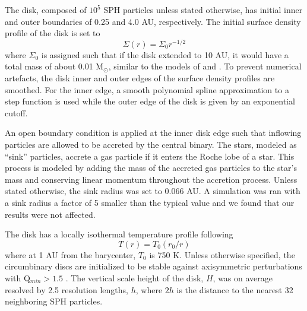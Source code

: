 The disk, composed of $10^5$ SPH particles unless stated otherwise, has initial inner and outer boundaries of 0.25 and 4.0 AU,
respectively.  The initial surface density profile of the disk is set to 
\begin{equation}
\Sigma(r) = \Sigma_0 r^{-1/2}
\end{equation}
 where $\Sigma_0$ is assigned such that if the disk extended to 10 AU, it would have a total mass of about 0.01 
M$_{\odot}$, similar to the models of \citet{PierensNelson07} and \citet{Kley2014}.  To prevent numerical 
artefacts, the disk inner and outer edges of the surface density profiles are smoothed.  For the inner edge, a smooth polynomial spline approximation to a step function is used while the outer edge of the disk is given by an exponential cutoff.
 
An open boundary condition is applied at the inner disk edge such that inflowing particles are allowed to be accreted
by the central binary.  The stars, modeled as ``sink'' particles, accrete a gas particle if it enters the Roche lobe of a star.  This process is modeled by adding the mass of the accreted gas particles to the star's mass and conserving linear momentum throughout the accretion process.  Unless stated otherwise, the 
sink radius was set to 0.066 AU.  A simulation was ran with a sink radius a factor of 5 smaller than the typical value and we found that our results were not 
affected.
 
The disk has a locally isothermal temperature profile following 
\begin{equation}
\label{eqn:disc_temp_profile}
T(r) = T_0(r_0/r)
\end{equation}
where at 1 AU from the barycenter, $T_0$ is
750 K.  Unless otherwise specified, the circumbinary discs are initialized to be stable against axisymmetric perturbations with Q$_{min} > 1.5$ \citep{Toomre64}.
The vertical scale height of the disk, $H$, was on average resolved by
  2.5 resolution lengths, $h$, where $2 h$ is the distance
to the nearest 32 neighboring SPH particles.

